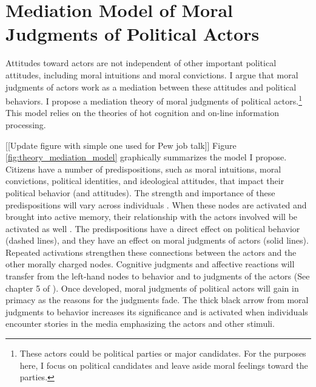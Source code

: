 \section{Mediation Model of Moral Judgments of Political Actors}\label{sec:theory_model}
Attitudes toward actors are not independent of other important political attitudes, including moral intuitions and moral convictions. I argue that moral judgments of actors work as a mediation between these attitudes and political behaviors. I propose a mediation theory of moral judgments of political actors.\footnote{These actors could be political parties or major candidates. For the purposes here, I focus on political candidates and leave aside moral feelings toward the parties.} This model relies on the theories of hot cognition and on-line information processing.

[[Update figure with simple one used for Pew job talk]] Figure \ref{fig:theory_mediation_model} graphically summarizes the model I propose. Citizens have a number of predispositions, such as moral intuitions, moral convictions, political identities, and ideological attitudes, that impact their political behavior (and attitudes). The strength and importance of these predispositions will vary across individuals \cite{Zaller1992}. When these nodes are activated and brought into active memory, their relationship with the actors involved will be activated as well \cite{TaberLodgeGlathar2001}. The predispositions have a direct effect on political behavior (dashed lines), and they have an effect on moral judgments of actors (solid lines). Repeated activations strengthen these connections between the actors and the other morally charged nodes. Cognitive judgments and affective reactions will transfer from the left-hand nodes to behavior and to judgments of the actors (See chapter 5 of ). Once developed, moral judgments of political actors will gain in primacy as the reasons for the judgments fade. The thick black arrow from moral judgments to behavior increases its significance and is activated when individuals encounter stories in the media emphasizing the actors and other stimuli.

